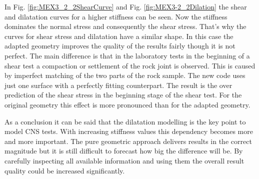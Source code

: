 In Fig. \ref{fig:MEX3_2_2ShearCurve} and Fig. \ref{fig:MEX3-2_2Dilation} the shear and dilatation curves for a higher stiffness can be seen. Now the stiffness dominates the normal stress and consequently the shear stress. That's why the curves for shear stress and dilatation have a similar shape. In this case the adapted geometry improves the quality of the results fairly though it is not perfect. The main difference is that in the laboratory tests in the beginning of a shear test a compaction or settlement of the rock joint is observed. This is caused by imperfect matching of the two parts of the rock sample. The new code uses just one surface with a perfectly fitting counterpart. The result is the over prediction of the shear stress in the beginning stage of the shear test. For the original geometry this effect is more pronounced than for the adapted geometry.

As a conclusion it can be said that the dilatation modelling is the key point to model CNS tests. With increasing stiffness values this dependency becomes more and more important. The pure geometric approach delivers results in the correct magnitude but it is still difficult to forecast how big the difference will be. By carefully inspecting all available information and using them the overall result quality could be increased significantly.